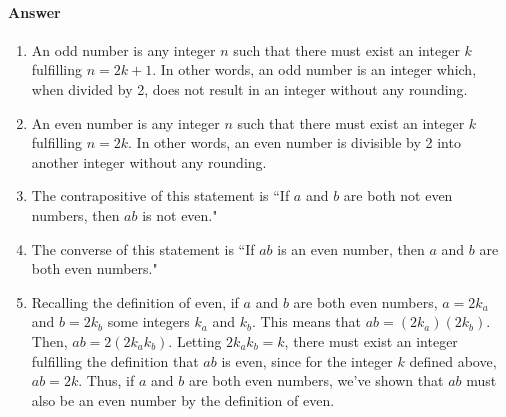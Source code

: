 \documentclass{article}
\begin{document}
\paragraph{Answer}


\begin{enumerate}
	\item An odd number is any integer $n$ such that there must exist an integer $k$ fulfilling
		$n=2k+1$. In other words, an odd number is an integer which, when divided by 2, does
		not result in an integer without any rounding.
	\item An even number is any integer $n$ such that there must exist an integer $k$ fulfilling
		$n=2k$. In other words, an even number is divisible by 2 into another integer without
		any rounding.
	\item The contrapositive of this statement is ``If $a$ and $b$ are both not even numbers,
		then $ab$ is not even."
	\item The converse of this statement is ``If $ab$ is an even number, then $a$ and $b$ are both 
		even numbers."
	\item Recalling the definition of even, if $a$ and $b$ are both even numbers, $a=2k_a$ and $b=2k_b$
		some integers $k_a$ and $k_b$. This means that $ab = (2k_a)(2k_b)$. Then, $ab=2(2k_{a}k_{b})$.
		Letting $2k_{a}k_{b}=k$, there must exist an integer fulfilling the definition that
		$ab$ is even, since for the integer $k$ defined above, $ab=2k$. Thus, if $a$ and $b$ are both 
		even numbers, we've shown that $ab$ must also be an even number by the definition of even.
\end{enumerate}

\end{document}
